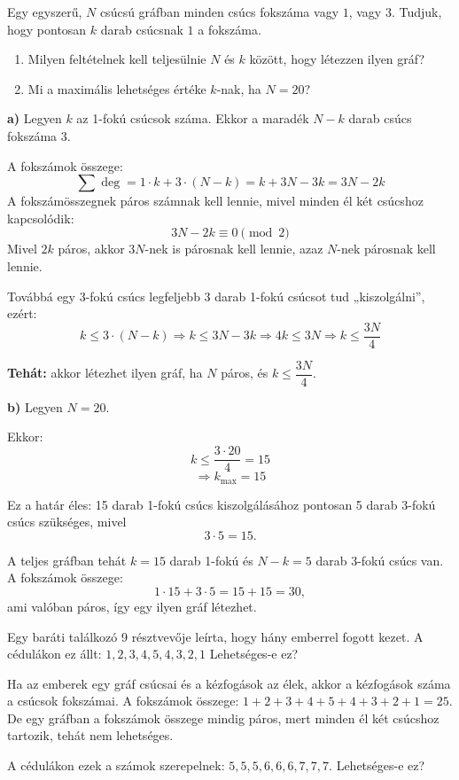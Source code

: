 \begin{extraproblem}
Egy egyszerű, $N$ csúcsú gráfban minden csúcs fokszáma vagy $1$, vagy $3$. Tudjuk, hogy pontosan $k$ darab csúcsnak $1$ a fokszáma.


\begin{enumerate}
    \item Milyen feltételnek kell teljesülnie $N$ és $k$ között, hogy létezzen ilyen gráf?
    \item Mi a maximális lehetséges értéke $k$-nak, ha $N = 20$?
\end{enumerate}
\end{extraproblem}
\begin{solution}

\textbf{a)} Legyen $k$ az 1-fokú csúcsok száma. Ekkor a maradék $N - k$ darab csúcs fokszáma $3$.

A fokszámok összege:
\[
\sum \deg = 1 \cdot k + 3 \cdot (N - k) = k + 3N - 3k = 3N - 2k
\]
A fokszámösszegnek páros számnak kell lennie, mivel minden él két csúcshoz kapcsolódik:
\[
3N - 2k \equiv 0 \pmod{2}
\]
Mivel $2k$ páros, akkor $3N$-nek is párosnak kell lennie, azaz $N$-nek párosnak kell lennie.

Továbbá egy 3-fokú csúcs legfeljebb 3 darab 1-fokú csúcsot tud „kiszolgálni”, ezért:
\[
k \leq 3 \cdot (N - k)
\Rightarrow k \leq 3N - 3k
\Rightarrow 4k \leq 3N
\Rightarrow k \leq \frac{3N}{4}
\]

\textbf{Tehát:} akkor létezhet ilyen gráf, ha $N$ páros, és $k \leq \dfrac{3N}{4}$.

\vspace{1em}
\textbf{b)} Legyen $N = 20$.

Ekkor:
\[
k \leq \frac{3 \cdot 20}{4} = 15
\]
\[
\Rightarrow \boxed{k_{\max} = 15}
\]

Ez a határ éles: 15 darab 1-fokú csúcs kiszolgálásához pontosan 5 darab 3-fokú csúcs szükséges, mivel
\[
3 \cdot 5 = 15.
\]

A teljes gráfban tehát $k = 15$ darab 1-fokú és $N-k = 5$ darab 3-fokú csúcs van. A fokszámok összege:
\[
1 \cdot 15 + 3 \cdot 5 = 15 + 15 = 30,
\]
ami valóban páros, így egy ilyen gráf létezhet.
\end{solution}
\begin{extraproblem}
Egy baráti találkozó 9 résztvevője leírta, hogy hány emberrel fogott
kezet. A cédulákon ez állt: $1,2,3,4,5,4,3,2,1$ Lehetséges-e ez? 
\end{extraproblem}

\begin{solution}
Ha az emberek egy gráf csúcsai és a kézfogások az élek, akkor a kézfogások
száma a csúcsok fokszámai. A fokszámok összege: $1+2+3+4+5+4+3+2+1=25$.
De egy gráfban a fokszámok összege mindig páros, mert minden él két
csúcshoz tartozik, tehát nem lehetséges.
\end{solution}
\begin{extraproblem}
A cédulákon ezek a számok szerepelnek: $5,5,5,6,6,6,7,7,7$. Lehetséges-e
ez? 
\end{extraproblem}

